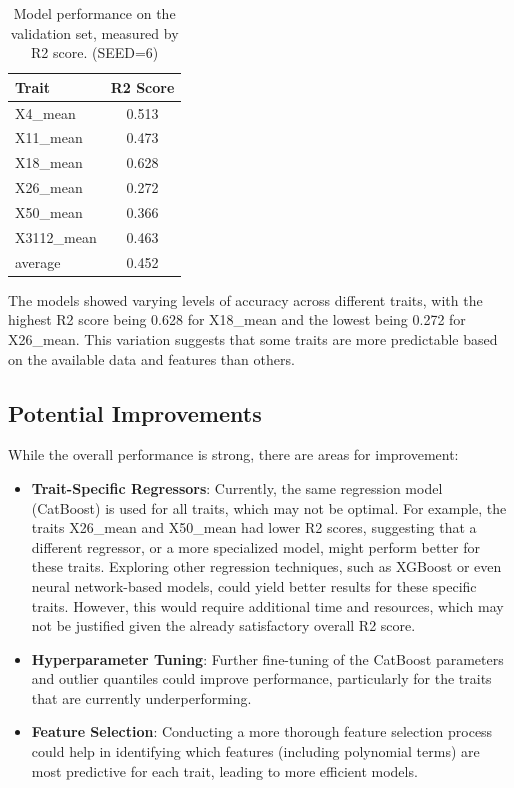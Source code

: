 \documentclass{article}
\begin{document}
\begin{table}[h]
	\centering
	\caption{Model performance on the validation set, measured by R2 score. (SEED=6)}
	\begin{tabular}{lc}
		\toprule
		Trait       & R2 Score \\
		\midrule
		X4\_mean    & 0.513    \\
		X11\_mean   & 0.473    \\
		X18\_mean   & 0.628    \\
		X26\_mean   & 0.272    \\
		X50\_mean   & 0.366    \\
		X3112\_mean & 0.463    \\
		\midrule
		average     & 0.452    \\
		\bottomrule
	\end{tabular}
	\label{tab:r2-scores}
\end{table}

The models showed varying levels of accuracy across different traits, with the highest R2 score being 0.628 for X18\_mean and the lowest being 0.272 for X26\_mean. This variation suggests that some traits are more predictable based on the available data and features than others.

\subsection{Potential Improvements}
While the overall performance is strong, there are areas for improvement:
\begin{itemize}
	\item \textbf{Trait-Specific Regressors}: Currently, the same regression model (CatBoost) is used for all traits, which may not be optimal. For example, the traits X26\_mean and X50\_mean had lower R2 scores, suggesting that a different regressor, or a more specialized model, might perform better for these traits. Exploring other regression techniques, such as XGBoost or even neural network-based models, could yield better results for these specific traits. However, this would require additional time and resources, which may not be justified given the already satisfactory overall R2 score.
	\item \textbf{Hyperparameter Tuning}: Further fine-tuning of the CatBoost parameters and outlier quantiles could improve performance, particularly for the traits that are currently underperforming.
	\item \textbf{Feature Selection}: Conducting a more thorough feature selection process could help in identifying which features (including polynomial terms) are most predictive for each trait, leading to more efficient models.
\end{itemize}
\end{document}
